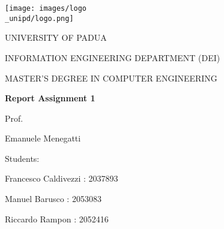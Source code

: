 \begin{titlepage}
    \begin{center}
        \texttt{[image: images/logo\\\_unipd/logo.png]}
        
        \vspace*{1cm}
        \Large
        \textmd{UNIVERSITY OF PADUA}
        
        \vspace*{1cm}
        \large
        \textmd{INFORMATION ENGINEERING DEPARTMENT (DEI)}
                
        \vspace*{0.5cm}
        \large
        \textmd{MASTER'S DEGREE IN COMPUTER ENGINEERING} 
                
        \vspace*{1cm}
        \Huge
        \textbf{Report Assignment 1}
        
        
        \raggedright
        \vspace*{1cm}
        \large
        \textmd{Prof.}
        
        \textmd{Emanuele Menegatti}
        
        \raggedleft
        \vspace*{0.5cm}
        \large
        \textmd{Students:}
                
        \textmd{Francesco Caldivezzi : 2037893}       
        
        \textmd{Manuel Barusco : 2053083}        
        
        \textmd{Riccardo Rampon : 2052416}
        
    \end{center}
\end{titlepage}